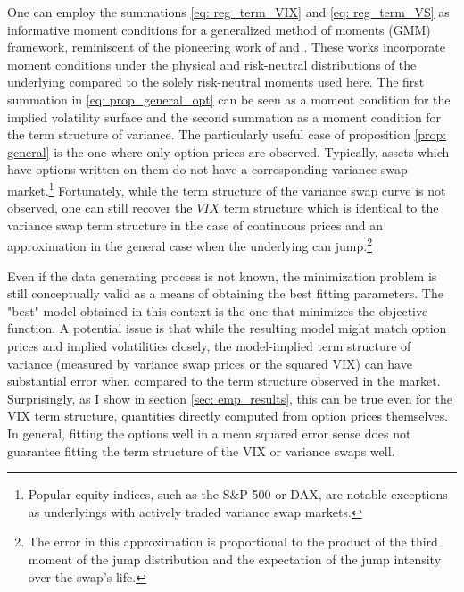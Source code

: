 \documentclass[12pt]{article}
\begin{document}
One can employ the summations \eqref{eq: reg_term_VIX} and \eqref{eq: reg_term_VS} as informative moment conditions for a generalized method of moments (GMM) framework, reminiscent of the pioneering work of \cite{chernov2000study} and \cite{pan2002jump}. These works incorporate moment conditions under the physical and risk-neutral distributions of the underlying compared to the solely risk-neutral moments used here. The first summation in \eqref{eq: prop_general_opt} can be seen as a moment condition for the implied volatility surface and the second summation as a moment condition for the term structure of variance. The particularly useful case of proposition \ref{prop: general} is the one where only option prices are observed. Typically, assets which have options written on them do not have a corresponding variance swap market.\footnote{Popular equity indices, such as the S\&P 500 or DAX, are notable exceptions as underlyings with actively traded variance swap markets.} Fortunately, while the term structure of the variance swap curve is not observed, one can still recover the $VIX$ term structure which is identical to the variance swap term structure in the case of continuous prices and an approximation in the general case when the underlying can jump.\footnote{The error in this approximation is proportional to the product of the third moment of the jump distribution and the expectation of the jump intensity over the swap's life.} 

Even if the data generating process is not known, the minimization problem is still conceptually valid as a means of obtaining the best fitting parameters. The "best" model obtained in this context is the one that minimizes the objective function. A potential issue is that while the resulting model might match option prices and implied volatilities closely, the model-implied term structure of variance (measured by variance swap prices or the squared VIX) can have substantial error when compared to the term structure observed in the market. Surprisingly, as I show in section \ref{sec: emp_results}, this can be true even for the VIX term structure, quantities directly computed from option prices themselves. In general, fitting the options well in a mean squared error sense does not guarantee fitting the term structure of the VIX or variance swaps well. 
\end{document}
